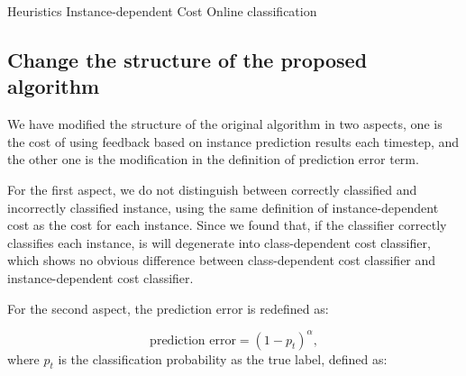 \documentclass{article}
\begin{document}
\begin{algorithm}
	\caption{Heuristics Instance-dependent Cost Online classification}
\end{algorithm}


\subsection{Change the structure of the proposed algorithm}

We have modified the structure of the original algorithm in two aspects, one is the cost of using feedback based on instance prediction results each timestep, and the other one is the modification in the definition of prediction error term.

For the first aspect, we do not distinguish between correctly classified and incorrectly classified instance, using the same definition of instance-dependent cost as the cost for each instance. Since we found that, if the classifier correctly classifies each instance, is will degenerate into class-dependent cost classifier, which shows no obvious difference between class-dependent cost classifier and instance-dependent cost classifier.


For the second aspect, the prediction error is redefined as: 

\begin{equation}
	\text{prediction error} = (1 - p_t)^\alpha,
\end{equation}
 where $p_t$ is the classification probability as the true label, defined as:
 
\end{document}
